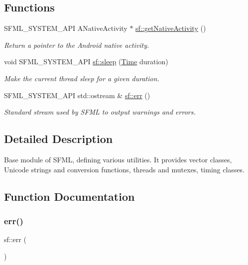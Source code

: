 \subsection*{Functions}
\begin{DoxyCompactItemize}
\item 
S\+F\+M\+L\+\_\+\+S\+Y\+S\+T\+E\+M\+\_\+\+A\+PI A\+Native\+Activity $\ast$ \hyperlink{group__system_ga9f5460043bdbd5be0ccccd2e6f0ddc41}{sf\+::get\+Native\+Activity} ()
\begin{DoxyCompactList}\small\item\em Return a pointer to the Android native activity. \end{DoxyCompactList}\item 
void S\+F\+M\+L\+\_\+\+S\+Y\+S\+T\+E\+M\+\_\+\+A\+PI \hyperlink{group__system_ga2f2620831533dee0ed432ed982342e09}{sf\+::sleep} (\hyperlink{classsf_1_1_time}{Time} duration)
\begin{DoxyCompactList}\small\item\em Make the current thread sleep for a given duration. \end{DoxyCompactList}\item 
S\+F\+M\+L\+\_\+\+S\+Y\+S\+T\+E\+M\+\_\+\+A\+PI std\+::ostream \& \hyperlink{group__system_ga7fe7f475639e26334606b5142c29551f}{sf\+::err} ()
\begin{DoxyCompactList}\small\item\em Standard stream used by S\+F\+ML to output warnings and errors. \end{DoxyCompactList}\end{DoxyCompactItemize}


\subsection{Detailed Description}
Base module of S\+F\+ML, defining various utilities. It provides vector classes, Unicode strings and conversion functions, threads and mutexes, timing classes. 

\subsection{Function Documentation}
\mbox{\label{group__system_ga7fe7f475639e26334606b5142c29551f}} 
\subsubsection{\texorpdfstring{err()}{err()}}
{\footnotesize\ttfamily sf\+::err (\begin{DoxyParamCaption}{ }\end{DoxyParamCaption})}



